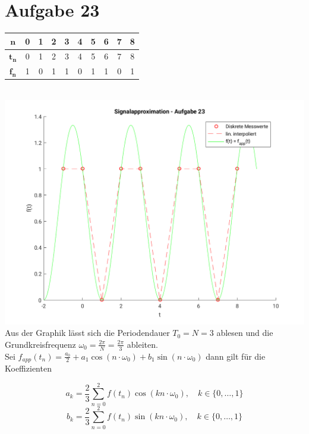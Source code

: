 	\section*{Aufgabe 23}
		\begin{tabular}{|c|c|c|c|c|c|c|c|c|c|}
			\hline
			$\mathbf{n}$   & 0 & 1 & 2 & 3   & 4 & 5 & 6 & 7 & 8 \\
			\hline
			$\mathbf{t_n}$ & 0 & 1 & 2 & 3   & 4 & 5 & 6 & 7 & 8 \\
			\hline
			$\mathbf{f_n}$ & 1 & 0 & 1 & 1 & 0 & 1 & 1 & 0 & 1\\
			\hline
		\end{tabular} \\
		\includegraphics[scale = 0.7]{A23_plot.png}\\
		Aus der Graphik lässt sich die Periodendauer $T_0 = N = 3$ ablesen und die Grundkreisfrequenz $\omega _0 = \frac{2\pi}{N} = \frac{2\pi}{3}$ ableiten.\\
		Sei $f_{app}(t_n) = \frac{a_0}{2} + a_1\cos\left(n\cdot\omega_0\right) + b_1\sin\left(n\cdot\omega_0\right)$ dann gilt für die Koeffizienten
		
		$$a_k = \frac{2}{3}\sum_{n=0}^2f(t_n)\cos\left(kn\cdot \omega_0\right),\quad k\in\{ 0, \dots, 1\}$$
		$$b_k = \frac{2}{3}\sum_{n=0}^2f(t_n)\sin\left(kn\cdot \omega_0\right),\quad k\in\{ 0, \dots, 1\}$$
		
